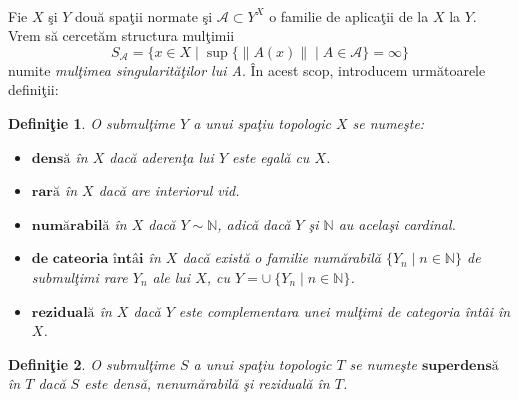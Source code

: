 \documentclass[a4paper,openany,12pt]{report}
\newtheorem{definition}{Defini\c tie}[section]
\begin{document}
\paragraph*{}
Fie $X$ \c si $ Y$ dou\u a spa\c tii normate \c si $\mathcal{A} \subset Y^X$ o familie de aplica\c tii de la $X$ la $Y$. Vrem s\u a cercet\u am structura mul\c timii
\begin{equation*}
S_{\mathcal{A}} = \big\{x \in X \mid \sup\{\|A(x)\| \mid A \in \mathcal{A}\} = \infty\big\}
\end{equation*}
numite \textit{mul\c timea singularit\u a\c tilor lui A}. \^ In acest scop, introducem urm\u atoarele defini\c tii:
\begin{definition} O submul\c time $Y$ a unui spa\c tiu topologic $X$ se nume\c ste:
\begin{itemize}
\item $\textbf{dens\u a}$ \^ in $X$ dac\u a aderen\c ta lui $Y$ este egal\u a cu $X$.
\item $\textbf{rar\u a}$ \^ in $X$ dac\u a are interiorul vid.
\item $\textbf{num\u arabil\u a}$ \^ in $X$ dac\u a $Y \sim \mathbb{N}$, adic\u a dac\u a $Y$ \c si $\mathbb{N}$ au acela\c si cardinal.
\item $\textbf{de cateoria \^ int\^ ai}$ \^ in $X$ dac\u a exist\u a o familie num\u arabil\u a $\{Y_n \mid n \in \mathbb{N}\}$ de submul\c timi rare $Y_n$ ale lui $X$, cu $Y = \cup \:\{Y_n \mid n \in \mathbb{N}\}$.
\item $\textbf{rezidual\u a}$ \^ in $X$ dac\u a $Y$ este complementara unei mul\c timi de categoria \^ int\^ai \^ in $X$.
\end{itemize}
\end{definition}
\begin{definition}
O submul\c time $S$ a unui spa\c tiu topologic $T$ se nume\c ste $\textbf{superdens\u a}$ \^ in $T$ dac\u a $S$ este dens\u a, nenum\u arabil\u a \c si rezidual\u a \^ in $T$.
\end{definition}
\end{document}
